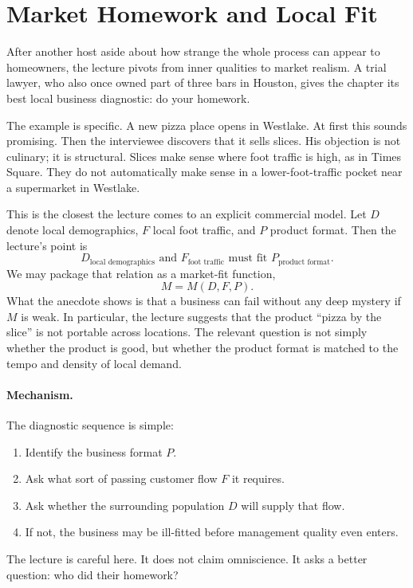 \section{Market Homework and Local Fit}

After another host aside about how strange the whole process can appear to homeowners, the lecture pivots from inner qualities to market realism. A trial lawyer, who also once owned part of three bars in Houston, gives the chapter its best local business diagnostic: do your homework.

The example is specific. A new pizza place opens in Westlake. At first this sounds promising. Then the interviewee discovers that it sells slices. His objection is not culinary; it is structural. Slices make sense where foot traffic is high, as in Times Square. They do not automatically make sense in a lower-foot-traffic pocket near a supermarket in Westlake.

This is the closest the lecture comes to an explicit commercial model. Let \(D\) denote local demographics, \(F\) local foot traffic, and \(P\) product format. Then the lecture's point is
\begin{equation}
D_{\text{local demographics}} \text{ and } F_{\text{foot traffic}} \text{ must fit } P_{\text{product format}}.
\end{equation}
We may package that relation as a market-fit function,
\begin{equation}
M = M(D,F,P).
\end{equation}
What the anecdote shows is that a business can fail without any deep mystery if \(M\) is weak. In particular, the lecture suggests that the product ``pizza by the slice'' is not portable across locations. The relevant question is not simply whether the product is good, but whether the product format is matched to the tempo and density of local demand.

\paragraph{Mechanism.}
The diagnostic sequence is simple:
\begin{enumerate}
\item Identify the business format \(P\).
\item Ask what sort of passing customer flow \(F\) it requires.
\item Ask whether the surrounding population \(D\) will supply that flow.
\item If not, the business may be ill-fitted before management quality even enters.
\end{enumerate}
The lecture is careful here. It does not claim omniscience. It asks a better question: who did their homework?

